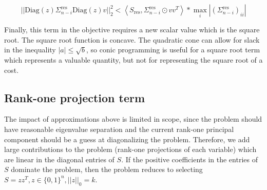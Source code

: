 \documentclass{article}
\begin{document}

$$
|| \text{Diag}(z) \Sigma_{n-i}^\text{res} \text{Diag}(z) v ||_2^2
< \left< S_\text{res}, \Sigma_{n-i}^\text{res} \odot v v^T \right>
* \max_{i} \left| \left( \Sigma_{n-i}^\text{res} \right)_{ii} \right|
$$

Finally, this term in the objective requires a new scalar value which is the square root. The square root function is concave. The quadratic cone can allow for slack in the inequality $|a| \le \sqrt{b}$, so conic programming is useful for a square root term which represents a valuable quantity, but not for representing the square root of a cost.






\subsection{Rank-one projection term}

The impact of approximations above is limited in scope, since the problem should have reasonable eigenvalue separation and the current rank-one principal component should be a guess at diagonalizing the problem. Therefore, we add large contributions to the problem (rank-one projections of each variable) which are linear in the diagonal entries of $S$. If the positive coefficients in the entries of $S$ dominate the problem, then the problem reduces to selecting $S = z z^T, z \in \{0,1\}^n, ||z||_0 = k$.
\end{document}
